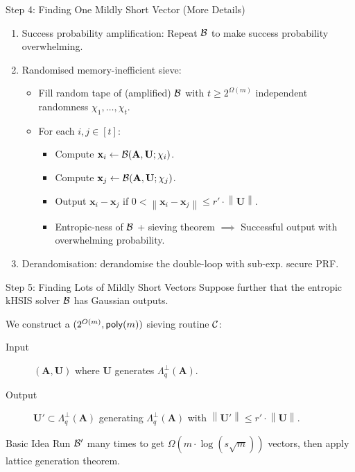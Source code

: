 \documentclass[xcolor=table,10pt,aspectratio=169]{beamer}
\renewcommand{\vec}[1]{\ensuremath{\mathbf{#1}}\xspace}
\newcommand{\norm}[1]{\left\lVert#1\right\rVert}
\providecommand{\mat}[1]{\ensuremath{\vec{#1}}\xspace}
\begin{document}
\begin{frame}[label={sec:org185f880}]{Step 4: Finding One Mildly Short Vector (More Details)}
\begin{enumerate}
\item Success probability amplification: Repeat \(\mathcal{B}\) to make success probability overwhelming.
\item Randomised memory-inefficient sieve:
\begin{itemize}
\item Fill random tape of (amplified) \(\mathcal{B}\) with \(t \geq 2^{\Omega(m)}\) independent randomness \(\chi_1, \ldots, \chi_t\).
\item For each \(i,j \in [t]\):
\begin{itemize}
\item Compute \(\vec{x}_i \gets \bdv(\mat{A}, \mat{U}; \chi_i)\).
\item Compute \(\vec{x}_j \gets \bdv(\mat{A}, \mat{U}; \chi_j)\).
\item Output \(\vec{x}_i - \vec{x}_j\) if \(0 < \norm{\vec{x}_i - \vec{x}_j} \leq r' \cdot \norm{\mat{U}}.\)
\item Entropic-ness of \(\mathcal{B}\) + sieving theorem \(\implies\) Successful output with overwhelming probability.
\end{itemize}
\end{itemize}
\item Derandomisation: derandomise the double-loop with sub-exp. secure PRF.
\end{enumerate}
\end{frame}

\begin{frame}[label={sec:orgb3671d3}]{Step 5: Finding Lots of Mildly Short Vectors}
Suppose further that the entropic kHSIS solver \(\mathcal{B}\) has Gaussian outputs.

We construct a \((2^{O(m)}, \poly[m])\) sieving routine \(\mathcal{C}\):

\begin{description}
\item[{Input}] \((\mat{A}, \mat{U})\) where \(\mat{U}\) generates \(\Lambda_q^\bot(\mat{A})\).
\item[{Output}] \(\mat{U}' \subset \Lambda_q^\bot(\mat{A})\) generating \(\Lambda_q^\bot(\mat{A})\) with \(\norm{\mat{U}'} \leq r' \cdot \norm{\mat{U}}\).
\end{description}

\begin{block}{Basic Idea}
Run \(\mathcal{B}'\) many times to get \(\Omega(m \cdot \log(s \sqrt{m}))\) vectors, then apply lattice generation theorem.
\end{block}
\end{frame}
\end{document}
